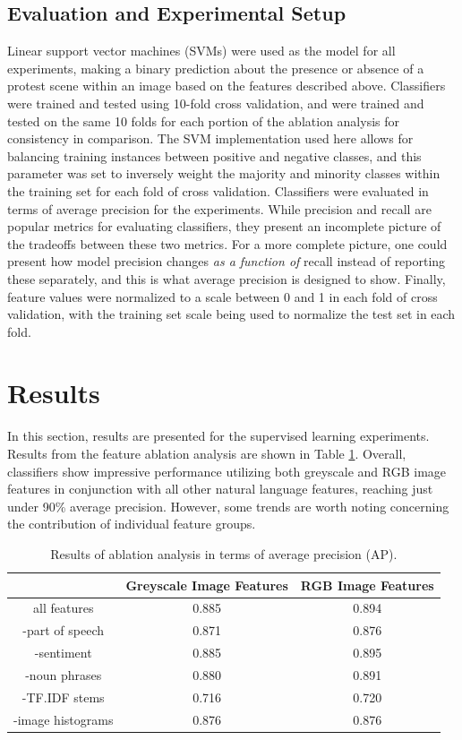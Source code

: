\documentclass[twoside,11pt]{article}
\begin{document}
\subsection{Evaluation and Experimental Setup}
Linear support vector machines (SVMs) were used as the model for all experiments, making a binary prediction about the presence or absence of a protest scene within an image based on the features described above. Classifiers were trained and tested using 10-fold cross validation, and were trained and tested on the same 10 folds for each portion of the ablation analysis for consistency in comparison. The SVM implementation used here allows for balancing training instances between positive and negative classes, and this parameter was set to inversely weight the majority and minority classes within the training set for each fold of cross validation. Classifiers were evaluated in terms of average precision for the experiments. While precision and recall are popular metrics for evaluating classifiers, they present an incomplete picture of the tradeoffs between these two metrics. For a more complete picture, one could present how model precision changes \emph{as a function of} recall instead of reporting these separately, and this is what average precision is designed to show. Finally, feature values were normalized to a scale between 0 and 1 in each fold of cross validation, with the training set scale being used to normalize the test set in each fold.

\section{Results}
In this section, results are presented for the supervised learning experiments. Results from the feature ablation analysis are shown in Table \ref{table:results}. Overall, classifiers show impressive performance utilizing both greyscale and RGB image features in conjunction with all other natural language features, reaching just under 90\% average precision. However, some trends are worth noting concerning the contribution of individual feature groups.

\begin{table}[h]
\centering
\begin{tabular}{c|c|c}
& Greyscale Image Features & RGB Image Features \\
\hline
all features & 0.885 & 0.894 \\
-part of speech & 0.871 & 0.876 \\
-sentiment & 0.885 & 0.895 \\
-noun phrases & 0.880 & 0.891 \\
-TF.IDF stems & 0.716 & 0.720 \\
-image histograms & 0.876 & 0.876 \\
\end{tabular}
\caption{Results of ablation analysis in terms of average precision (AP).}
\label{table:results}
\end{table}
\end{document}
